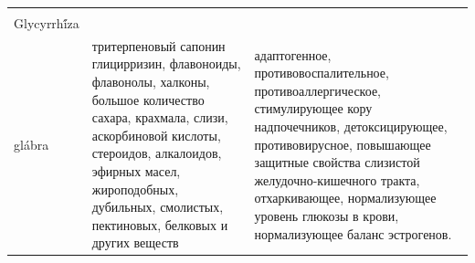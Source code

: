 \begin{longtable}[c]{|p{}|p{}|p{}|}
\begin{tabular}[c]{@{}l@{}}Солодка\\   Glycyrrhí́za\\ glábra\end{tabular} &
  тритерпеновый сапонин глицирризин, флавоноиды, флавонолы, халконы, большое количество сахара, крахмала, слизи, аскорбиновой кислоты, стероидов, алкалоидов, эфирных масел, жироподобных, дубильных, смолистых, пектиновых, белковых и других веществ &
  адаптогенное, противовоспалительное, противоаллергическое, стимулирующее кору надпочечников, детоксицирующее, противовирусное, повышающее защитные свойства слизистой желудочно-кишечного тракта, отхаркивающее, нормализующее уровень глюкозы в крови, нормализующее баланс эстрогенов. \\ \hline
\end{longtable}

